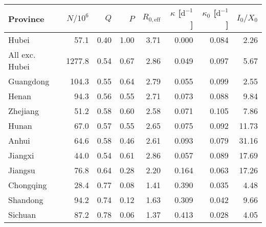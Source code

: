 \begin{tabular}{lrrrrrrr}
\hline
 Province       &   $N/10^6$ &   $Q$ &   $P$ &   $R_{0,\mathrm{eff}}$ &   $\kappa$ [$\mathrm{d}^{-1}$] &   $\kappa_{0}$ [$\mathrm{d}^{-1}$] &   $I_0/X_0$ \\
\hline
 Hubei          &       57.1 &  0.40 &  1.00 &                   3.71 &                          0.000 &                              0.084 &        2.26 \\
 All exc. Hubei &     1277.8 &  0.54 &  0.67 &                   2.86 &                          0.049 &                              0.097 &        5.67 \\
 Guangdong      &      104.3 &  0.55 &  0.64 &                   2.79 &                          0.055 &                              0.099 &        2.55 \\
 Henan          &       94.3 &  0.56 &  0.55 &                   2.71 &                          0.073 &                              0.088 &        9.84 \\
 Zhejiang       &       51.2 &  0.58 &  0.60 &                   2.58 &                          0.071 &                              0.105 &        7.86 \\
 Hunan          &       67.0 &  0.57 &  0.55 &                   2.65 &                          0.075 &                              0.092 &       11.73 \\
 Anhui          &       64.6 &  0.58 &  0.46 &                   2.61 &                          0.093 &                              0.079 &       31.16 \\
 Jiangxi        &       44.0 &  0.54 &  0.61 &                   2.86 &                          0.057 &                              0.089 &       17.69 \\
 Jiangsu        &       76.8 &  0.64 &  0.28 &                   2.20 &                          0.164 &                              0.063 &       17.26 \\
 Chongqing      &       28.4 &  0.77 &  0.08 &                   1.41 &                          0.390 &                              0.035 &        4.48 \\
 Shandong       &       94.2 &  0.74 &  0.12 &                   1.63 &                          0.309 &                              0.042 &        9.66 \\
 Sichuan        &       87.2 &  0.78 &  0.06 &                   1.37 &                          0.413 &                              0.028 &        4.05 \\

\end{tabular}
